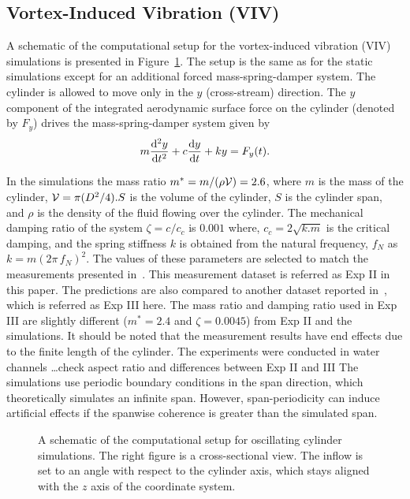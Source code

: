 \subsection{Vortex-Induced Vibration (VIV)}
\label{sec:VIV}
%
A schematic of the computational setup for the vortex-induced vibration (VIV)
simulations is presented in Figure~\ref{fig:VIVmodel}. The setup is the same as
for the static simulations except for an additional forced mass-spring-damper
system. The cylinder is allowed to move only in the $y$ (cross-stream)
direction. The $y$ component of the integrated aerodynamic surface force on the
cylinder (denoted by $F_y$) drives the mass-spring-damper system given by
%
\begin{equation}
  m \frac{{\rm d}^2 y}{{\rm d}t^2} + c \frac{{\rm d} y}{{\rm d}t} + k y = F_y(t).
  \label{eq:mass-spring-damper}
\end{equation}
 
In the simulations the mass ratio $m^*=m/(\rho {\cal V})=2.6$, where $m$ is the
mass of the cylinder, ${\cal V}=\pi (D^2/4) . S$ is the volume of the cylinder,
$S$ is the cylinder span, and $\rho$ is the density of the fluid flowing over
the cylinder. The mechanical damping ratio of the system $\zeta = c/c_c$ is
$0.001$ where, $c_c=2\sqrt{k.m}$ is the critical damping, and the spring
stiffness $k$ is obtained from the natural frequency, $f_N$ as
$k=m(2\pi\,f_N)^2$.  The values of these parameters are selected to match the
measurements presented in~\cite{franzini2013one}.  This measurement dataset is
referred as Exp II in this paper. The predictions are also compared to another
dataset reported in~\cite{khalak1997fluid}, which is referred as Exp III here.
The mass ratio and damping ratio used in Exp III are slightly different
($m^*=2.4$ and $\zeta=0.0045$) from Exp II and the simulations. It should be
noted that the measurement results have end effects due to the finite length of
the cylinder. {\color{red} The experiments were conducted in water channels
\ldots check aspect ratio and differences between Exp II and III} The
simulations use periodic boundary conditions in the span direction, which
theoretically simulates an infinite span. However, span-periodicity can induce
artificial effects if the spanwise coherence is greater than the simulated
span.
%
\begin{figure}[htb!]
  \caption{A schematic of the computational setup for oscillating cylinder
    simulations. The right figure is a cross-sectional view.  The inflow is set
    to an angle with respect to the cylinder axis, which stays aligned with the $z$
    axis of the coordinate system.}
  \label{fig:VIVmodel}
\end{figure}

